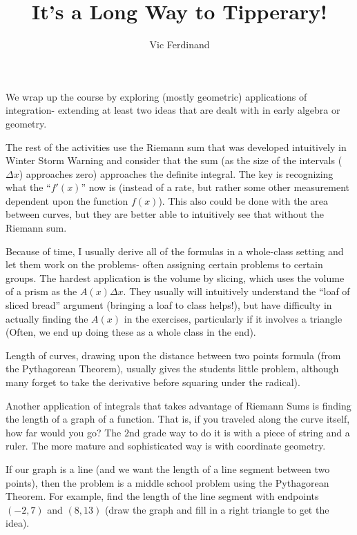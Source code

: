 \documentclass{ximera}
\author{Vic Ferdinand}
\title{It's a Long Way to Tipperary!}
\begin{document}
\begin{abstract}
\end{abstract}
\maketitle

\begin{instructorIntro}
We wrap up the course by exploring (mostly geometric) applications of integration- extending at least two ideas that are dealt with in early algebra or geometry.  

The rest of the activities use the Riemann sum that was developed intuitively in Winter Storm Warning and consider that the sum (as the size of the intervals ($\Delta x$) approaches zero) approaches the definite integral.  The key is recognizing what the ``$f'(x)$'' now is (instead of a rate, but rather some other measurement dependent upon the function $f(x)$).  This also could be done with the area between curves, but they are better able to intuitively see that without the Riemann sum. 

Because of time, I usually derive all of the formulas in a whole-class setting and let them work on the problems- often assigning certain problems to certain groups. The hardest application is the volume by slicing, which uses the volume of a prism as the $A(x) \Delta x$.  They usually will intuitively understand the ``loaf of sliced bread'' argument (bringing a loaf to class helps!), but have difficulty in actually finding the $A(x)$ in the exercises, particularly if it involves a triangle (Often, we end up doing these as a whole class in the end).

Length of curves, drawing upon the distance between two points formula (from the Pythagorean Theorem), usually gives the students little problem, although many forget to take the derivative before squaring under the radical).

\end{instructorIntro}

Another application of integrals that takes advantage of Riemann Sums is finding the length of a graph of a function.  That is, if you traveled along the curve itself, how far would you go?  The $2$nd grade way to do it is with a piece of string and a ruler.  The more mature and sophisticated way is with coordinate geometry.  

If our graph is a line (and we want the length of a line segment between two points), then the problem is a middle school problem using the Pythagorean Theorem.  For example, find the length of the line segment with endpoints $(-2, 7)$ and $(8, 13)$ (draw the graph and fill in a right triangle to get the idea).
\end{document}
